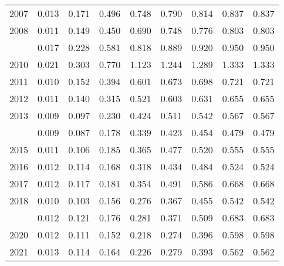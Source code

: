\documentclass[
]{article}
\begin{document}
\begin{longtable}[t]{lrrrrrrrr}
2007 & 0.013 & 0.171 & 0.496 & 0.748 & 0.790 & 0.814 & 0.837 & 0.837\\
2008 & 0.011 & 0.149 & 0.450 & 0.690 & 0.748 & 0.776 & 0.803 & 0.803\\
\addlinespace
2009 & 0.017 & 0.228 & 0.581 & 0.818 & 0.889 & 0.920 & 0.950 & 0.950\\
2010 & 0.021 & 0.303 & 0.770 & 1.123 & 1.244 & 1.289 & 1.333 & 1.333\\
2011 & 0.010 & 0.152 & 0.394 & 0.601 & 0.673 & 0.698 & 0.721 & 0.721\\
2012 & 0.011 & 0.140 & 0.315 & 0.521 & 0.603 & 0.631 & 0.655 & 0.655\\
2013 & 0.009 & 0.097 & 0.230 & 0.424 & 0.511 & 0.542 & 0.567 & 0.567\\
\addlinespace
2014 & 0.009 & 0.087 & 0.178 & 0.339 & 0.423 & 0.454 & 0.479 & 0.479\\
2015 & 0.011 & 0.106 & 0.185 & 0.365 & 0.477 & 0.520 & 0.555 & 0.555\\
2016 & 0.012 & 0.114 & 0.168 & 0.318 & 0.434 & 0.484 & 0.524 & 0.524\\
2017 & 0.012 & 0.117 & 0.181 & 0.354 & 0.491 & 0.586 & 0.668 & 0.668\\
2018 & 0.010 & 0.103 & 0.156 & 0.276 & 0.367 & 0.455 & 0.542 & 0.542\\
\addlinespace
2019 & 0.012 & 0.121 & 0.176 & 0.281 & 0.371 & 0.509 & 0.683 & 0.683\\
2020 & 0.012 & 0.111 & 0.152 & 0.218 & 0.274 & 0.396 & 0.598 & 0.598\\
2021 & 0.013 & 0.114 & 0.164 & 0.226 & 0.279 & 0.393 & 0.562 & 0.562\\*
\end{longtable}
\end{document}
